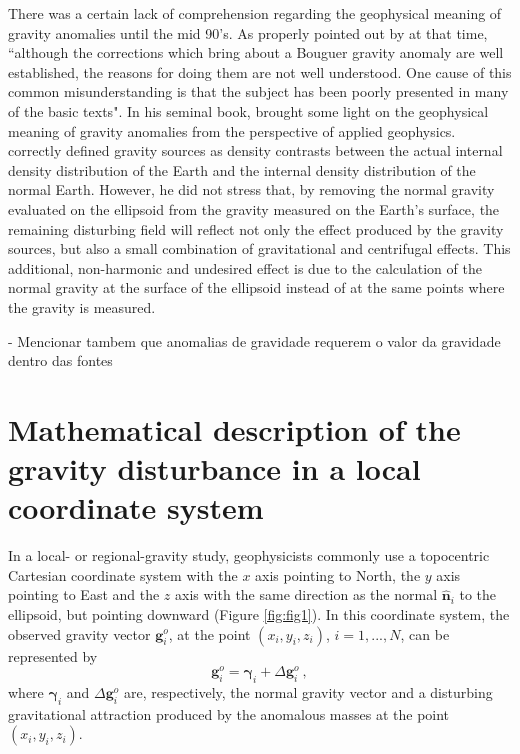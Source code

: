 \documentclass[manuscript]{geophysics}
\begin{document}
There was a certain lack of comprehension regarding the
geophysical meaning of gravity anomalies until the
mid 90's.
As properly pointed out by \citet{chapin1996} at that time, 
``although the corrections which bring about a Bouguer 
gravity anomaly are well established, the reasons for doing
them are not well understood. One cause of this common 
misunderstanding is that the subject has been poorly presented in
many of the basic texts".
In his seminal book, \citet{blakely1996} brought some light
on the geophysical meaning of gravity anomalies from the 
perspective of applied geophysics. \citet{blakely1996} correctly
defined gravity sources as density contrasts between the actual
internal density distribution of the Earth and the internal density
distribution of the normal Earth.
However, he did not stress that, by removing the normal gravity 
evaluated on the ellipsoid from the gravity measured 
on the Earth's surface, the remaining disturbing field will reflect 
not only the effect produced by the gravity sources, but also a
small combination of gravitational and centrifugal effects.
This additional, non-harmonic and undesired effect is 
due to the calculation of the normal gravity at the surface of the ellipsoid
instead of at the same points where the gravity is measured.

- Mencionar tambem que anomalias de gravidade requerem o
valor da gravidade dentro das fontes


\section{Mathematical description of the gravity disturbance in a local coordinate system}

In a local- or regional-gravity study, 
geophysicists commonly use a topocentric Cartesian coordinate system
with the $x$ axis pointing to North, the $y$ axis pointing to East and 
the $z$ axis with the same direction as the normal $\hat{\mathbf{n}}_{i}$
to the ellipsoid, but pointing downward (Figure \ref{fig:fig1}).
In this coordinate system, the observed gravity vector
$\mathbf{g}^{o}_{i}$, at the point $(x_{i}, y_{i}, z_{i})$, 
$i = 1, ..., N$, can be represented by
\begin{equation}
\mathbf{g}^{o}_{i} = \boldsymbol{\gamma}_{i} + \Delta \mathbf{g}^{o}_{i} \: ,
\label{eq:gravity-vector}
\end{equation}
where $\boldsymbol{\gamma}_{i}$ and $\Delta \mathbf{g}^{o}_{i}$
are, respectively, the normal gravity vector and a
disturbing gravitational attraction produced by the anomalous 
masses at the point $(x_{i}, y_{i}, z_{i})$.
\end{document}

